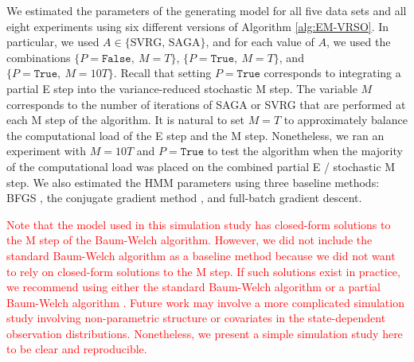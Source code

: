 We estimated the parameters of the generating model for all five data sets and all eight experiments using six different versions of Algorithm \ref{alg:EM-VRSO}. In particular, we used $A \in \{\text{SVRG, SAGA}\}$, and for each value of $A$, we used the combinations $\{P = \texttt{False}, ~ M = T\}$, $\{P = \texttt{True}, ~ M = T\}$, and $\{P = \texttt{True}, ~ M = 10T\}$. Recall that setting $P = \texttt{True}$ corresponds to integrating a partial E step into the variance-reduced stochastic M step. The variable $M$ corresponds to the number of iterations of SAGA or SVRG that are performed at each M step of the algorithm. It is natural to set $M=T$ to approximately balance the computational load of the E step and the M step. Nonetheless, we ran an experiment with $M=10T$ and $P = \texttt{True}$ to test the algorithm when the majority of the computational load was placed on the combined partial E / stochastic M step. We also estimated the HMM parameters using three baseline methods: BFGS \citep{Fletcher:2000}, the conjugate gradient method \citep{Fletcher:1964}, and full-batch gradient descent. 

\textcolor{red}{Note that the model used in this simulation study has closed-form solutions to the M step of the Baum-Welch algorithm. However, we did not include the standard Baum-Welch algorithm as a baseline method because we did not want to rely on closed-form solutions to the M step. If such solutions exist in practice, we recommend using either the standard Baum-Welch algorithm or a partial Baum-Welch algorithm \citep{Neal:1998}. Future work may involve a more complicated simulation study involving non-parametric structure or covariates in the state-dependent observation distributions. Nonetheless, we present a simple simulation study here to be clear and reproducible.}

